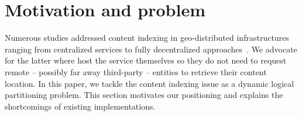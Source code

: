 


\section{Motivation and problem}
\label{sec:background}



Numerous studies addressed content indexing in geo-distributed
infrastructures ranging from centralized services to fully
decentralized approaches~\cite{squirrel}. We advocate for the latter
where \processes host the service themselves so they do not need to
request remote -- possibly far away third-party -- entities to
retrieve their content location.  In this paper, we tackle the content
indexing issue as a dynamic logical partitioning problem. This section
motivates our positioning and explains the shortcomings of existing
implementations.


